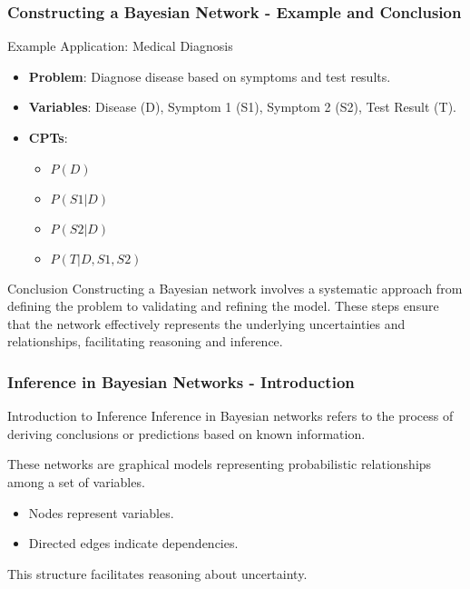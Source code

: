 \documentclass[aspectratio=169]{beamer}
\begin{document}
\begin{frame}[fragile]
    \frametitle{Constructing a Bayesian Network - Example and Conclusion}
    \begin{block}{Example Application: Medical Diagnosis}
        \begin{itemize}
            \item \textbf{Problem}: Diagnose disease based on symptoms and test results.
            \item \textbf{Variables}: Disease (D), Symptom 1 (S1), Symptom 2 (S2), Test Result (T).
            \item \textbf{CPTs}:
                \begin{itemize}
                    \item $P(D)$
                    \item $P(S1 | D)$
                    \item $P(S2 | D)$
                    \item $P(T | D, S1, S2)$
                \end{itemize}
        \end{itemize}
    \end{block}
    
    \begin{block}{Conclusion}
        Constructing a Bayesian network involves a systematic approach from defining the problem to validating and refining the model. These steps ensure that the network effectively represents the underlying uncertainties and relationships, facilitating reasoning and inference.
    \end{block}
\end{frame}

\begin{frame}[fragile]
    \frametitle{Inference in Bayesian Networks - Introduction}
    \begin{block}{Introduction to Inference}
        Inference in Bayesian networks refers to the process of deriving conclusions or predictions based on known information.
    \end{block}
    These networks are graphical models representing probabilistic relationships among a set of variables. 
    \begin{itemize}
        \item Nodes represent variables.
        \item Directed edges indicate dependencies.
    \end{itemize}
    This structure facilitates reasoning about uncertainty.
\end{frame}
\end{document}
